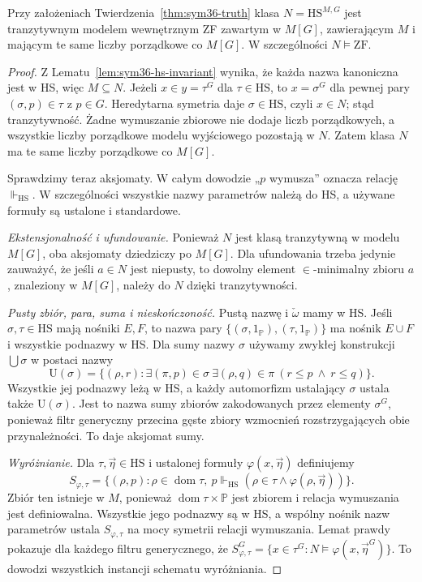 \begin{twierdzenie}
\label{thm:sym36-zf}
Przy założeniach
Twierdzenia~\ref{thm:sym36-truth}
klasa $N=\mathrm{HS}^{M,G}$ jest
tranzytywnym modelem wewnętrznym ZF
zawartym w $M[G]$, zawierającym $M$
i mającym te same liczby porządkowe co $M[G]$.
W szczególności $N\models\mathrm{ZF}$.
\end{twierdzenie}
\begin{proof}
Z Lematu~\ref{lem:sym36-hs-invariant}
wynika, że każda nazwa kanoniczna jest w HS,
więc $M\subseteq N$. Jeżeli $x\in y=\tau^G$
dla $\tau\in\mathrm{HS}$, to
$x=\sigma^G$ dla pewnej pary
$(\sigma,p)\in\tau$ z $p\in G$.
Heredytarna symetria daje $\sigma\in\mathrm{HS}$,
czyli $x\in N$; stąd tranzytywność.
Żadne wymuszanie zbiorowe nie dodaje
liczb porządkowych, a wszystkie
liczby porządkowe modelu wyjściowego
pozostają w $N$. Zatem klasa $N$ ma
te same liczby porządkowe co $M[G]$.

Sprawdzimy teraz aksjomaty.
W całym dowodzie „$p$ wymusza”
oznacza relację $\Vdash_{\mathrm{HS}}$.
W szczególności wszystkie nazwy parametrów
należą do HS, a używane
formuły są ustalone i standardowe.

\emph{Ekstensjonalność i ufundowanie.}
Ponieważ $N$ jest klasą tranzytywną
w modelu $M[G]$, oba aksjomaty dziedziczy
po $M[G]$. Dla ufundowania trzeba jedynie
zauważyć, że jeśli $a\in N$ jest niepusty,
to dowolny element $\in$-minimalny
zbioru $a$, znaleziony w $M[G]$,
należy do $N$ dzięki tranzytywności.

\emph{Pusty zbiór, para, suma i nieskończoność.}
Pustą nazwę i $\check\omega$ mamy w HS.
Jeśli $\sigma,\tau\in\mathrm{HS}$
mają nośniki $E,F$, to nazwa pary
$\{(\sigma,1_{\mathbb P}),(\tau,1_{\mathbb P})\}$
ma nośnik $E\cup F$ i wszystkie podnazwy
w HS. Dla sumy nazwy $\sigma$
używamy zwykłej konstrukcji
$\bigcup\sigma$ w postaci nazwy
\[
 \mathrm U(\sigma)=
 \{(\rho,r):\exists(\pi,p)\in\sigma\
       \exists(\rho,q)\in\pi\
       (r\le p\ \land\ r\le q)\}.
\]
Wszystkie jej podnazwy leżą w HS,
a każdy automorfizm ustalający
$\sigma$ ustala także $\mathrm U(\sigma)$.
Jest to nazwa sumy zbiorów
zakodowanych przez elementy $\sigma^G$,
ponieważ filtr generyczny przecina
gęste zbiory wzmocnień rozstrzygających
obie przynależności. To daje aksjomat sumy.

\emph{Wyróżnianie.}
Dla $\tau,\vec\eta\in\mathrm{HS}$
i ustalonej formuły
$\varphi(x,\vec\eta)$ definiujemy
\[
 S_{\varphi,\tau}=
 \{(\rho,p):\rho\in\operatorname{dom}\tau,\
   p\Vdash_{\mathrm{HS}}
    (\rho\in\tau\land\varphi(\rho,\vec\eta))\}.
\]
Zbiór ten istnieje w $M$,
ponieważ $\operatorname{dom}\tau\times\mathbb P$
jest zbiorem i relacja wymuszania
jest definiowalna. Wszystkie jego podnazwy
są w HS, a wspólny nośnik nazw parametrów
ustala $S_{\varphi,\tau}$ na mocy symetrii
relacji wymuszania. Lemat prawdy pokazuje
dla każdego filtru generycznego, że
$S_{\varphi,\tau}^G=
 \{x\in\tau^G:N\models\varphi(x,\vec\eta^G)\}$.
To dowodzi wszystkich instancji
schematu wyróżniania.


\end{proof}
